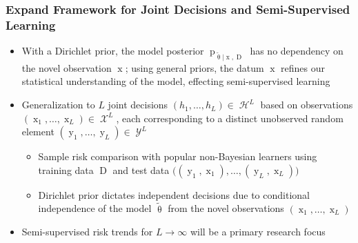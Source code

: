 \documentclass[aspectratio=169,usenames,dvipsnames]{beamer}
\DeclareMathOperator{\xrm}{\mathrm{x}}
\DeclareMathOperator{\yrm}{\mathrm{y}}
\DeclareMathOperator{\Drm}{\mathrm{D}}
\DeclareMathOperator{\prm}{\mathrm{p}}
\DeclareMathOperator{\Xcal}{\mathcal{X}}
\DeclareMathOperator{\Ycal}{\mathcal{Y}}
\DeclareMathOperator{\Hcal}{\mathcal{H}}
\begin{document}
\begin{frame}
\frametitle{Expand Framework for Joint Decisions and Semi-Supervised Learning}

\begin{itemize}
\item With a Dirichlet prior, the model posterior $\prm_{\tilde{\uptheta} | \xrm,\Drm}$ has no dependency on the novel observation $\xrm$; using general priors, the datum $\xrm$ refines our statistical understanding of the model, effecting \alert{semi-supervised} learning 
\vspace{0.5em}
\item Generalization to $L$ joint decisions $(h_1,\ldots,h_L) \in \Hcal^L$ based on observations $(\xrm_1,\ldots,\xrm_L) \in \Xcal^L$, each corresponding to a distinct unobserved random element $(\yrm_1,\ldots,\yrm_L) \in \Ycal^L$
\vspace{0.25em}
	\begin{itemize}
	\item \alert{Sample risk} comparison with popular non-Bayesian learners using training data $\Drm$ and test data $\big( (\yrm_1,\xrm_1),\ldots,(\yrm_L,\xrm_L)\big)$
	\vspace{0.25em}
	\item Dirichlet prior dictates \alert{independent decisions} due to conditional independence of the model $\tilde{\uptheta}$ from the novel observations $(\xrm_1,\ldots,\xrm_L)$
	\end{itemize}
\vspace{0.5em}
\item Semi-supervised risk trends for $L \to \infty$ will be a primary research focus
\end{itemize}

\end{frame}


\begin{frame}[allowframebreaks]
\frametitle{References}
\small
{}[text]
%

%
}
\end{frame}
\end{document}

